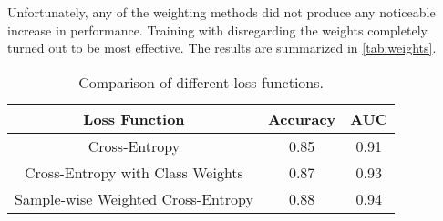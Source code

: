 Unfortunately, any of the weighting methods did not produce any noticeable increase in performance. Training with
disregarding the weights completely turned out to be most effective. The results are summarized in
\autoref{tab:weights}.

\begin{table}[htb]
    \centering
    \begin{tabular}{ccc}
        \toprule
        Loss Function                      & Accuracy & AUC  \\
        \midrule
        Cross-Entropy                      & 0.85     & 0.91 \\
        Cross-Entropy with Class Weights   & 0.87     & 0.93 \\
        Sample-wise Weighted Cross-Entropy & 0.88     & 0.94 \\
        \bottomrule
    \end{tabular}
    \caption{Comparison of different loss functions.}
    \label{tab:weights}
\end{table}
